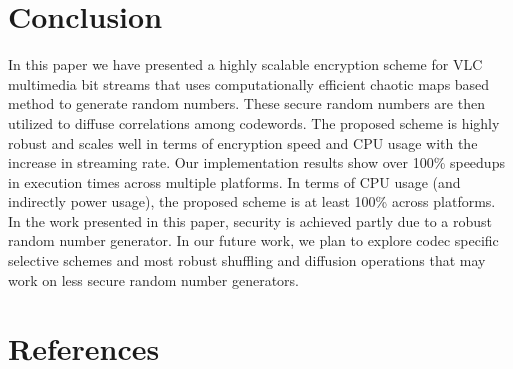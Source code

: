 \documentclass[preprint]{elsarticle}
\begin{document}
 
 
\section{Conclusion}
\label{conclusion}

In this paper we have presented a highly scalable encryption scheme for VLC multimedia bit streams that uses computationally efficient chaotic maps based method to generate random numbers. These secure random numbers are then utilized to diffuse correlations among codewords. The proposed scheme is highly robust and scales well in terms of encryption speed and CPU usage with the increase in streaming rate. Our implementation results show over 100\% speedups in execution times across multiple platforms. In terms of CPU usage (and indirectly power usage), the proposed scheme is at least 100\% across platforms. In the work presented in this paper, security is achieved partly due to a robust random number generator. In our future work, we plan to explore codec specific selective schemes and most robust shuffling and diffusion operations that may work on less secure random number generators.


\section*{References}


\end{document}
